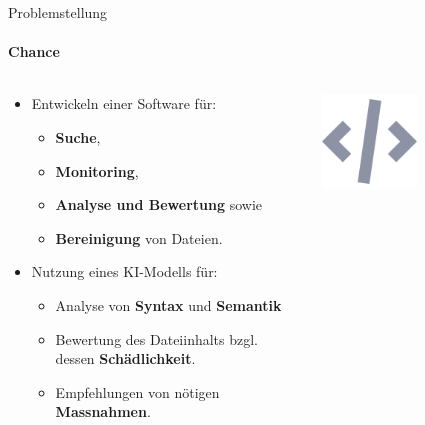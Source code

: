 \documentclass[
    ngerman,%
    authorontitle=true,
]{bfhbeamer}
\begin{document}
    \begin{frame}{Problemstellung}
        \framesubtitle{Chance}
        \begin{columns}
            \begin{column}{0.7\textwidth}
                \begin{itemize}
                    \item Entwickeln einer Software für:
                    \begin{itemize}
                        \item \textbf{Suche},
                        \item \textbf{Monitoring},
                        \item \textbf{Analyse und Bewertung} sowie
                        \item \textbf{Bereinigung} von Dateien.
                    \end{itemize}
                    \item Nutzung eines KI-Modells für:
                    \begin{itemize}
                        \item Analyse von \textbf{Syntax} und \textbf{Semantik}
                        \item Bewertung des Dateiinhalts bzgl.
                        dessen \textbf{Schädlichkeit}.
                        \item Empfehlungen von nötigen \textbf{Massnahmen}.
                    \end{itemize}
                \end{itemize}
            \end{column}
            \begin{column}{0.3\textwidth}
                \begin{center}
                    \includegraphics[width=0.5\textwidth]{assets/presentation/code}
                \end{center}
            \end{column}
        \end{columns}
    \end{frame}
\end{document}
